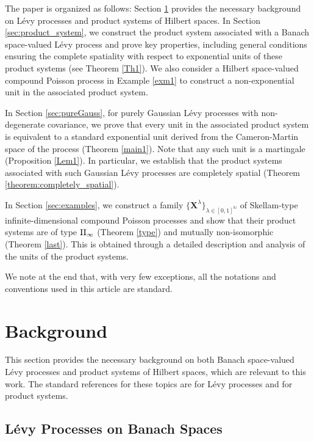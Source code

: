 \documentclass[11pt]{amsart}
\theoremstyle{definition}
\theoremstyle{remark}
\numberwithin{equation}{section}
\begin{document}
The paper is organized as follows: Section \ref{sec:background} provides the necessary background on L\'evy processes and product systems of Hilbert spaces. In Section \ref{sec:product_system}, we construct the product system associated with a Banach space-valued L\'evy process and prove key properties, including general conditions ensuring the complete spatiality with respect to exponential units of these product systems (see Theorem \ref{Th1}). We also consider a Hilbert space-valued compound Poisson process in Example \ref{exm1} to construct a non-exponential unit in the associated product system.

In Section \ref{sec:pureGauss}, for purely Gaussian L\'evy processes with non-degenerate covariance, we prove that every unit in the associated product system is equivalent to a standard exponential unit derived from the Cameron-Martin space of the process (Theorem \ref{main1}). Note that any such unit is a martingale (Proposition \ref{Lem1}). In particular, we establish that the product systems associated with such Gaussian L\'evy processes are completely spatial (Theorem \ref{theorem:completely_spatial}).

In Section  \ref{sec:examples}, we construct a family  \(\{\bm{X}^\lambda\}_{\lambda\in  [0,1]^\mathbb{N}}\) of Skellam-type infinite-dimensional compound Poisson processes and show that their product systems are of type \(\mathrm{II}\sb{\infty}\) (Theorem \ref{type}) and mutually non-isomorphic (Theorem \ref{last}). This is obtained through a detailed description and analysis of the units of the product systems.

We note at the end that, with very few exceptions, all the notations and conventions used in this article are standard.


\section{Background}\label{sec:background}

This section provides the necessary background on both Banach space-valued L\'evy processes and product systems of Hilbert spaces, which are relevant to this work. The standard references for these topics are \cite{Sato1, Applebaum} for L\'evy processes and \cite{A7, A2} for product systems.

\subsection{L\'evy Processes on Banach Spaces}
\end{document}
